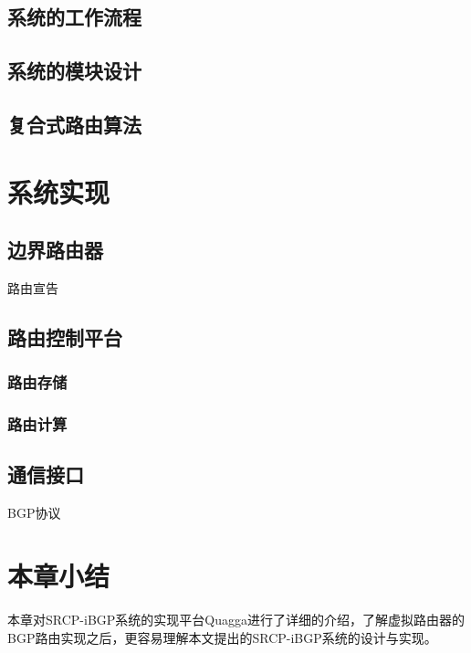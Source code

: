 \subsection{系统的工作流程}

\subsection{系统的模块设计}

\subsection{复合式路由算法}


\section{系统实现}

\subsection{边界路由器}
路由宣告
\subsection{路由控制平台}
\subsubsection{路由存储}
\subsubsection{路由计算}
\subsection{通信接口}
BGP协议
\section{本章小结}
本章对SRCP-iBGP系统的实现平台Quagga进行了详细的介绍，了解虚拟路由器的BGP路由实现之后，更容易理解本文提出的SRCP-iBGP系统的设计与实现。
